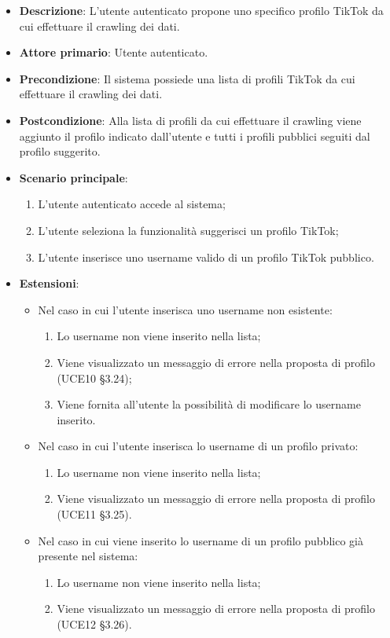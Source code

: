 \begin{itemize}
	\item \textbf{Descrizione}: L'utente autenticato propone uno specifico profilo TikTok da cui effettuare il crawling dei dati.
    \item \textbf{Attore primario}: Utente autenticato.
    \item \textbf{Precondizione}: Il sistema possiede una lista di profili TikTok da cui effettuare il crawling dei dati.
    \item \textbf{Postcondizione}: Alla lista di profili da cui effettuare il crawling viene aggiunto il profilo indicato dall’utente e tutti i profili pubblici seguiti dal profilo suggerito.
    \item \textbf{Scenario principale}: 
    \begin{enumerate}
        \item L'utente autenticato accede al sistema;
        \item L’utente seleziona la funzionalità suggerisci un profilo TikTok;
        \item L’utente inserisce uno username valido di un profilo TikTok pubblico.
    \end{enumerate}
    \item \textbf{Estensioni}:
    \begin{itemize}
        \item Nel caso in cui l’utente inserisca uno username non esistente:
        \begin{enumerate}
            \item Lo username non viene inserito nella lista;
            \item Viene visualizzato un messaggio di errore nella proposta di profilo (UCE10 §3.24);
            \item Viene fornita all’utente la possibilità di modificare lo username inserito.
        \end{enumerate}
        \item Nel caso in cui l’utente inserisca lo username di un profilo privato:
        \begin{enumerate}
            \item Lo username non viene inserito nella lista;
            \item Viene visualizzato un messaggio di errore nella proposta di profilo (UCE11 §3.25).
        \end{enumerate}
        \item Nel caso in cui viene inserito lo username di un profilo pubblico già presente nel sistema:
        \begin{enumerate}
            \item Lo username non viene inserito nella lista;
            \item Viene visualizzato un messaggio di errore nella proposta di profilo (UCE12 §3.26).
        \end{enumerate} 
    \end{itemize}
\end{itemize}

\pagebreak